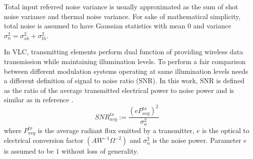 Total input referred noise variance is usually approximated as the sum of shot noise variance and thermal noise variance.  For sake of mathematical simplicity, total noise is assumed to have Gaussian statistics with mean $0$ and variance $\sigma_{n}^{2} = \sigma_{sh}^{2} + \sigma_{th}^{2}$.

In VLC, transmitting elements perform dual function of providing wireless data transmission while maintaining illumination levels. To perform a fair comparison between different modulation systems operating at same illumination levels needs a different definition of signal to noise ratio (SNR). In this work, SNR is defined as the ratio of the average transmitted electrical power to noise power and is similar as in reference \cite{fat13a}. 
\begin{equation}
	\label{eqSNR}
	SNR^{tx}_{avg} := \frac{(eP_{avg}^{tx})^2}{\sigma_n^{2}}
\end{equation}
where $P_{avg}^{tx}$ is the average radiant flux emitted by a transmitter, $e$ is the optical to electrical conversion factor $(AW^{-1}\Omega^{-2})$ and $\sigma_n^{2}$ is the noise power. Parameter $e$ is assumed to be $1$ without loss of generality.